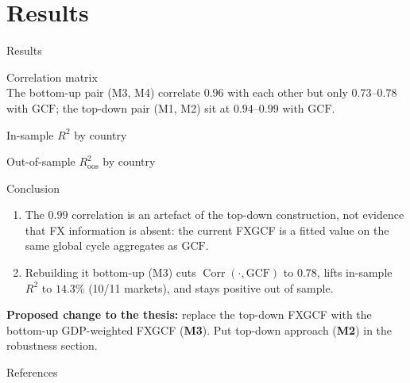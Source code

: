 \documentclass[10pt]{beamer}
\newcommand{\GCF}{\mathrm{GCF}}
\DeclareMathOperator{\Corr}{Corr}
\begin{document}
\section{Results}
\begin{frame}{Results}
  \centering
  
\end{frame}

\begin{frame}{Correlation matrix}
  \centering
  \\[1ex]
  {\scriptsize The bottom-up pair (M3, M4) correlate $0.96$ with each other but
   only $0.73$--$0.78$ with $\GCF$; the top-down pair (M1, M2) sit at
   $0.94$--$0.99$ with $\GCF$.}
\end{frame}

\begin{frame}{In-sample $R^2$ by country}
  \centering
  
\end{frame}

\begin{frame}{Out-of-sample $R^2_{\mathrm{oos}}$ by country}
  \centering
  
\end{frame}

\begin{frame}{Conclusion}
  \begin{enumerate}
    \item The $0.99$ correlation is an \alert{artefact of the top-down
      construction}, not evidence that FX information is absent: the current
      FXGCF is a fitted value on the same global cycle aggregates as $\GCF$.
    \item Rebuilding it \alert{bottom-up} (M3) cuts $\Corr(\cdot,\GCF)$ to $0.78$, lifts in-sample $R^2$ to
      $14.3\%$ (10/11 markets), and stays positive out of sample.
  \end{enumerate}
  \vfill
  \raggedright \textbf{Proposed change to the thesis:} replace the top-down FXGCF
  with the bottom-up GDP-weighted FXGCF (\textbf{M3}). Put top-down approach (\textbf{M2}) in the robustness section.
\end{frame}

\begin{frame}{References}
  \small
  
\end{frame}
\end{document}
